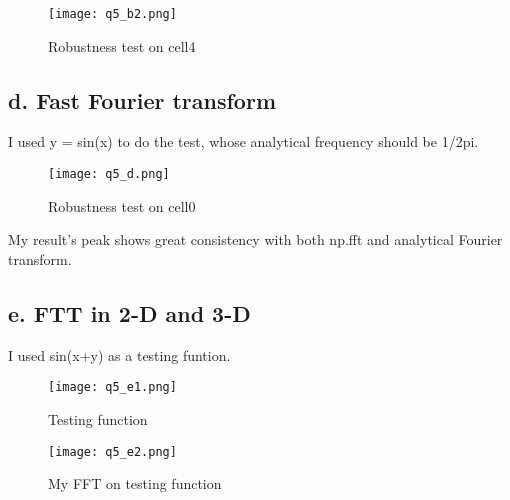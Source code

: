 \begin{figure}
  \centering
  \texttt{[image: q5\_b2.png]}
  \caption{Robustness test on cell4}
  \label{fig:cell4}
\end{figure}


\subsection{d. Fast Fourier transform}


I used y = sin(x) to do the test, whose analytical frequency should be 1/2pi.

\begin{figure}
  \centering
  \texttt{[image: q5\_d.png]}
  \caption{Robustness test on cell0}
  \label{fig:FFT_1D}
\end{figure}

My result's peak shows great consistency with both np.fft and analytical Fourier transform.


\subsection{e. FTT in 2-D and 3-D}



I used sin(x+y) as a testing funtion.

\begin{figure}
  \centering
  \texttt{[image: q5\_e1.png]}
  \caption{Testing function}
  \label{fig:FFT_2D_fun}
\end{figure}


\begin{figure}
  \centering
  \texttt{[image: q5\_e2.png]}
  \caption{My FFT on testing function}
  \label{fig:FFT_2D}
\end{figure}
